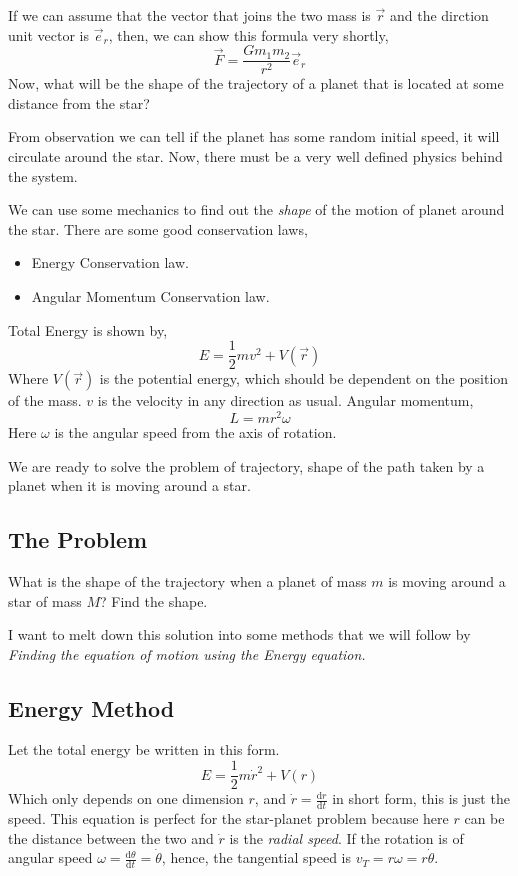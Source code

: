 \documentclass[11pt,a4paper]{article}
\newcommand{ \pk }[1]{\begin{problem} #1 \end{problem} }
\begin{document}
If we can assume that the vector that joins the two mass is $\vec{r}$ and the dirction unit vector is $\vec{e}_r$, then, we can show this formula very shortly,
\[ 
\vec{F} = \frac{Gm_1m_2}{r^2} \vec{e}_r
\] 
Now, what will be the shape of the trajectory of a planet that is located at some distance from the star? 

From observation we can tell if the planet has some random initial speed, it will circulate around the star. Now, there must be a very well defined physics behind the system. 

We can use some mechanics to find out the \emph{shape} of the motion of planet around the star. There are some good conservation laws,
\begin{itemize}
    \item Energy Conservation law.
    \item Angular Momentum Conservation law.
\end{itemize}
Total Energy is shown by, 
\[ 
    E = \frac{1}{2} mv^2 + V(\vec{r})
\] 
Where $V(\vec{r})$ is the potential energy, which should be dependent on the position of the mass. $v$ is the velocity in any direction as usual. Angular momentum,
\[ 
L = mr^2 \omega
\] 
Here $\omega$ is the angular speed from the axis of rotation. 

We are ready to solve the problem of trajectory, shape of the path taken by a planet when it is moving around a star. 


\subsection{ The Problem }
\pk{ What is the shape of the trajectory when a planet of mass $m$ is moving around a star of mass $M $? Find the shape. }

I want to melt down this solution into some methods that we will follow by \emph{Finding the equation of motion using the Energy equation.}

\subsection{ Energy Method }
Let the total energy be written in this form. 
\[ 
    E = \frac{1}{2} m \dot{r}^2 + V(r)
\] Which only depends on one dimension $r$, and $ \dot{r} = \frac{\mathrm{d} r}{\mathrm{d} t}$ in short form, this is just the speed. This equation is perfect for the star-planet problem because here $r$ can be the distance between the two and $ \dot{r}$ is the \emph{radial speed}. If the rotation is of angular speed $\omega = \frac{\mathrm{d} \theta}{\mathrm{d} t} = \dot{\theta}$, hence, the tangential speed is $v_T = r\omega = r \dot{\theta}$.
\end{document}
